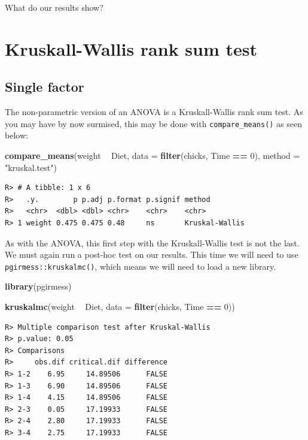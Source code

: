 \documentclass[english,10pt,a4paper,oneside]{book}
\newenvironment{Shaded}{\begin{snugshade}}{\end{snugshade}}
\newcommand{\KeywordTok}[1]{\textcolor[rgb]{0.13,0.29,0.53}{\textbf{#1}}}
\newcommand{\DataTypeTok}[1]{\textcolor[rgb]{0.13,0.29,0.53}{#1}}
\newcommand{\DecValTok}[1]{\textcolor[rgb]{0.00,0.00,0.81}{#1}}
\newcommand{\StringTok}[1]{\textcolor[rgb]{0.31,0.60,0.02}{#1}}
\newcommand{\OperatorTok}[1]{\textcolor[rgb]{0.81,0.36,0.00}{\textbf{#1}}}
\newcommand{\NormalTok}[1]{#1}
\theoremstyle{definition}
\theoremstyle{definition}
\theoremstyle{definition}
\theoremstyle{remark}
\begin{document}
What do our results show?

\section{Kruskall-Wallis rank sum
test}\label{kruskall-wallis-rank-sum-test-1}

\subsection{Single factor}\label{single-factor-2}

The non-parametric version of an ANOVA is a Kruskall-Wallis rank sum
test. As you may have by now surmised, this may be done with
\texttt{compare\_means()} as seen below:

\begin{Shaded}
\begin{Highlighting}[]
\KeywordTok{compare_means}\NormalTok{(weight }\OperatorTok{~}\StringTok{ }\NormalTok{Diet, }\DataTypeTok{data =} \KeywordTok{filter}\NormalTok{(chicks, Time }\OperatorTok{==}\StringTok{ }\DecValTok{0}\NormalTok{), }\DataTypeTok{method =} \StringTok{"kruskal.test"}\NormalTok{)}
\end{Highlighting}
\end{Shaded}

\begin{verbatim}
R> # A tibble: 1 x 6
R>   .y.        p p.adj p.format p.signif method        
R>   <chr>  <dbl> <dbl> <chr>    <chr>    <chr>         
R> 1 weight 0.475 0.475 0.48     ns       Kruskal-Wallis
\end{verbatim}

As with the ANOVA, this first step with the Kruskall-Wallis test is not
the last. We must again run a post-hoc test on our results. This time we
will need to use \texttt{pgirmess::kruskalmc()}, which means we will
need to load a new library.

\begin{Shaded}
\begin{Highlighting}[]
\KeywordTok{library}\NormalTok{(pgirmess)}

\KeywordTok{kruskalmc}\NormalTok{(weight }\OperatorTok{~}\StringTok{ }\NormalTok{Diet, }\DataTypeTok{data =} \KeywordTok{filter}\NormalTok{(chicks, Time }\OperatorTok{==}\StringTok{ }\DecValTok{0}\NormalTok{))}
\end{Highlighting}
\end{Shaded}

\begin{verbatim}
R> Multiple comparison test after Kruskal-Wallis 
R> p.value: 0.05 
R> Comparisons
R>     obs.dif critical.dif difference
R> 1-2    6.95     14.89506      FALSE
R> 1-3    6.90     14.89506      FALSE
R> 1-4    4.15     14.89506      FALSE
R> 2-3    0.05     17.19933      FALSE
R> 2-4    2.80     17.19933      FALSE
R> 3-4    2.75     17.19933      FALSE
\end{verbatim}
\end{document}
